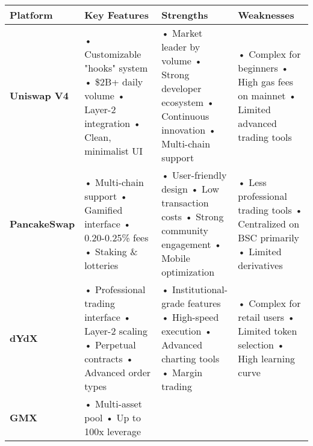 \documentclass{article}
\begin{document}
\begin{longtable}{|p{}|p{}|p{}|p{}|}
\hline
\textbf{Platform} & \textbf{Key Features} & \textbf{Strengths} & \textbf{Weaknesses} \\
\hline
\textbf{Uniswap V4} & 
• Customizable "hooks" system \newline
• \$2B+ daily volume \newline
• Layer-2 integration \newline
• Clean, minimalist UI &
• Market leader by volume \newline
• Strong developer ecosystem \newline
• Continuous innovation \newline
• Multi-chain support &
• Complex for beginners \newline
• High gas fees on mainnet \newline
• Limited advanced trading tools \\
\hline
\textbf{PancakeSwap} & 
• Multi-chain support \newline
• Gamified interface \newline
• 0.20-0.25\% fees \newline
• Staking \& lotteries &
• User-friendly design \newline
• Low transaction costs \newline
• Strong community engagement \newline
• Mobile optimization &
• Less professional trading tools \newline
• Centralized on BSC primarily \newline
• Limited derivatives \\
\hline
\textbf{dYdX} & 
• Professional trading interface \newline
• Layer-2 scaling \newline
• Perpetual contracts \newline
• Advanced order types &
• Institutional-grade features \newline
• High-speed execution \newline
• Advanced charting tools \newline
• Margin trading &
• Complex for retail users \newline
• Limited token selection \newline
• High learning curve \\
\hline
\textbf{GMX} & 
• Multi-asset pool \newline
• Up to 100x leverage \newline

\end{longtable}
\end{document}
